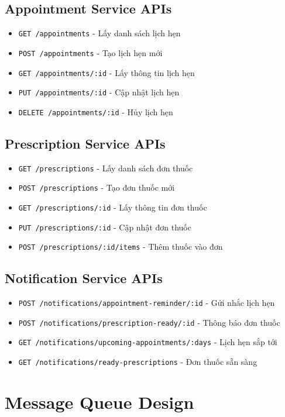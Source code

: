 \documentclass[12pt,a4paper]{report}
\begin{document}
\subsection{Appointment Service APIs}
\begin{itemize}
    \item \texttt{GET /appointments} - Lấy danh sách lịch hẹn
    \item \texttt{POST /appointments} - Tạo lịch hẹn mới
    \item \texttt{GET /appointments/:id} - Lấy thông tin lịch hẹn
    \item \texttt{PUT /appointments/:id} - Cập nhật lịch hẹn
    \item \texttt{DELETE /appointments/:id} - Hủy lịch hẹn
\end{itemize}

\subsection{Prescription Service APIs}
\begin{itemize}
    \item \texttt{GET /prescriptions} - Lấy danh sách đơn thuốc
    \item \texttt{POST /prescriptions} - Tạo đơn thuốc mới
    \item \texttt{GET /prescriptions/:id} - Lấy thông tin đơn thuốc
    \item \texttt{PUT /prescriptions/:id} - Cập nhật đơn thuốc
    \item \texttt{POST /prescriptions/:id/items} - Thêm thuốc vào đơn
\end{itemize}

\subsection{Notification Service APIs}
\begin{itemize}
    \item \texttt{POST /notifications/appointment-reminder/:id} - Gửi nhắc lịch hẹn
    \item \texttt{POST /notifications/prescription-ready/:id} - Thông báo đơn thuốc
    \item \texttt{GET /notifications/upcoming-appointments/:days} - Lịch hẹn sắp tới
    \item \texttt{GET /notifications/ready-prescriptions} - Đơn thuốc sẵn sàng
\end{itemize}

\section{Message Queue Design}
\end{document}
